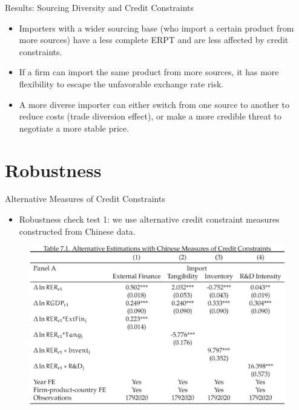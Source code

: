 \documentclass[10pt]{beamer}
\begin{document}
\begin{frame}{Results: Sourcing Diversity and Credit Constraints}
	\begin{tcolorbox}[colback=blue!5!white, colframe=blue!75!black,title=Key Finding 3]
		\begin{itemize}
			\item Importers with a wider sourcing base (who import a certain product from more sources) have a less complete ERPT and are less affected by credit constraints.
		\end{itemize}
	\end{tcolorbox}
	\begin{itemize}
		\item If a firm can import the same product from more sources, it has more flexibility to escape the unfavorable exchange rate risk.
		\item A more diverse importer can either switch from one source to another to reduce costs (trade diversion effect), or make a more credible threat to negotiate a more stable price.
	\end{itemize}
\end{frame}

\section{Robustness}

\begin{frame}{Alternative Measures of Credit Constraints}
	\begin{itemize}
		\item Robustness check test 1: we use alternative credit constraint measures constructed from Chinese data.
	\end{itemize}
	\begin{figure}[htbp]
		\centering
		\includegraphics[width=0.9\columnwidth]{Table7.1A.jpg}
		\label{tab7.1A}
	\end{figure}
\end{frame}
\end{document}

